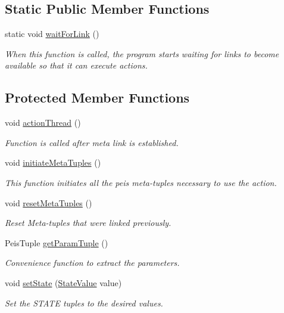 \subsection*{\-Static \-Public \-Member \-Functions}
\begin{DoxyCompactItemize}
\item 
static void \hyperlink{classexekutor_1_1ActionExekutor_a1aa23235e75f6c59983115b9e3c4dbfd}{wait\-For\-Link} ()
\begin{DoxyCompactList}\small\item\em \-When this function is called, the program starts waiting for links to become available so that it can execute actions. \end{DoxyCompactList}\end{DoxyCompactItemize}
\subsection*{\-Protected \-Member \-Functions}
\begin{DoxyCompactItemize}
\item 
void \hyperlink{classexekutor_1_1PickUpExekutor_a68fcf0ded6547a5b7711dcd5fbc75a21}{action\-Thread} ()
\begin{DoxyCompactList}\small\item\em \-Function is called after meta link is established. \end{DoxyCompactList}\item 
void \hyperlink{classexekutor_1_1ActionExekutor_ae2f81a4994766a040bf6fa1cf36fbfb5}{initiate\-Meta\-Tuples} ()
\begin{DoxyCompactList}\small\item\em \-This function initiates all the peis meta-\/tuples necessary to use the action. \end{DoxyCompactList}\item 
void \hyperlink{classexekutor_1_1ActionExekutor_a73b5509aeadf1d592b3b2b27bd9ce2ae}{reset\-Meta\-Tuples} ()
\begin{DoxyCompactList}\small\item\em \-Reset \-Meta-\/tuples that were linked previously. \end{DoxyCompactList}\item 
\-Peis\-Tuple \hyperlink{classexekutor_1_1ActionExekutor_ac1e62ad386692ab2cd7e8ae2173f1eb5}{get\-Param\-Tuple} ()
\begin{DoxyCompactList}\small\item\em \-Convenience function to extract the parameters. \end{DoxyCompactList}\item 
void \hyperlink{classexekutor_1_1ActionExekutor_a47056dd4cb829acdbfd6a43378d3f332}{set\-State} (\hyperlink{namespaceexekutor_a82e43e24945d434a81cc5d50282a0e6d}{\-State\-Value} value)
\begin{DoxyCompactList}\small\item\em \-Set the \-S\-T\-A\-T\-E tuples to the desired values. \end{DoxyCompactList}\end{DoxyCompactItemize}
